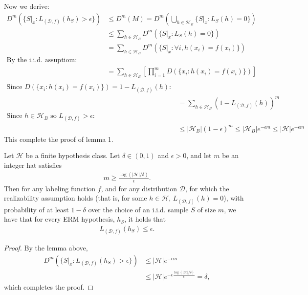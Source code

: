Now we derive:
\begin{align*}
    D^{m}(\{ S|_x : L_{(\mathcal{D},f)}(h_S) > \epsilon \}) &\le D^{m}(M) = D^{m}(\bigcup_{h \in \mathcal{H}_B}\{ S|_x : L_S(h) = 0 \})
    \\ &\le \sum\limits_{h \in \mathcal{H}_B} D^{m}(\{S|_x : L_S(h) = 0 \})
    \\ &= \sum\limits_{h \in \mathcal{H}_B} D^{m}(\{S|_x : \forall i, h(x_i) = f(x_i) \})
    \\ \text{By the i.i.d. assuptiom:}
    \\ &= \sum\limits_{h \in \mathcal{H}_B} \left[ \prod_{i = 1}^m D(\{x_i : h(x_i) = f(x_i) \}) \right]
\end{align*}
\begin{align*}
    \\ \text{Since } D(\{x_i : h(x_i) = f(x_i)\}) = 1- L_{(\mathcal{D},f)}(h):
    \\ &= \sum\limits_{h \in \mathcal{H}_B} (1- L_{(\mathcal{D},f)}(h))^{m}
    \\ \text{Since } h \in \mathcal{H}_B \text{ so } L_{(\mathcal{D},f)}> \epsilon:
    \\ &\le |\mathcal{H}_B|(1-\epsilon)^{m} \le |\mathcal{H}_B|e^{-\epsilon m} \le |\mathcal{H}|e^{-\epsilon m}
\end{align*}
This complete the proof of lemma 1.

\begin{corollary}
Let $\mathcal{H}$ be a finite hypothesis class. Let $\delta \in (0,1)$ and $\epsilon >0$, and let $m$ be an integer hat satisfies
\begin{align*}
    m \ge \frac{\log(|\mathcal{H}|/\delta)}{\epsilon}.
\end{align*}
Then for any labeling function $f$, and for any distribution $\mathcal{D}$, for which the realizability assumption holds (that is, for some $h \in \mathcal{H}$, $L_{(\mathcal{D}, f)}(h) = 0$), with probability of at least $1 - \delta$ over the choice of an i.i.d. sample $S$ of size $m$, we have that for every ERM hypothesis, $h_S$, it holds that
\begin{align*}
    L_{(\mathcal{D}, f)}(h_S) \le \epsilon.
\end{align*}
\end{corollary}
\begin{proof}
    By the lemma above,
    \begin{align*}
        D^{m}(\{ S|_x : L_{(\mathcal{D},f)}(h_S) > \epsilon \}) &\le |\mathcal{H}|e^{-\epsilon m}
        \\ &\le |\mathcal{H}|e^{-\epsilon \frac{\log(|\mathcal{H}|/\delta)}{\epsilon}} = \delta,
    \end{align*}
    which completes the proof.
\end{proof}


